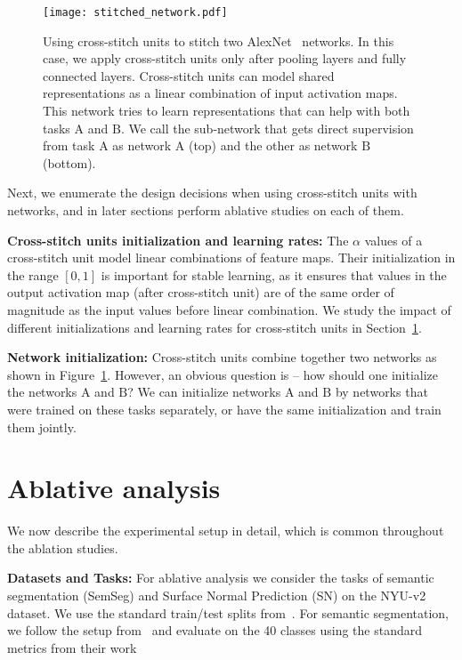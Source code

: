 \documentclass[10pt,twocolumn,letterpaper]{article}
\begin{document}
\begin{figure}[!ht]
\centering
\texttt{[image: stitched\_network.pdf]}
\caption{Using cross-stitch units to stitch two AlexNet~\cite{alexnet} networks. In this case, we apply cross-stitch units only after pooling layers and fully connected layers. Cross-stitch units can model shared representations as a linear combination of input activation maps. This network tries to learn representations that can help with both tasks $\mathrm{A}$ and $\mathrm{B}$. We call the sub-network that gets direct supervision from task $\mathrm{A}$ as network $\mathrm{A}$ (top) and the other as network $\mathrm{B}$ (bottom).}
\label{fig:cross-stitch-two}
\end{figure}

Next, we enumerate the design decisions when using cross-stitch units with networks, and in later sections perform ablative studies on each of them.

\par \noindent \textbf{Cross-stitch units initialization and learning rates:} The $\alpha$ values of a cross-stitch unit model linear combinations of feature maps. Their initialization in the range $\left[0,1\right]$ is important for stable learning, as it ensures that values in the output activation map (after cross-stitch unit) are of the same order of magnitude as the input values before linear combination. We study the impact of different initializations and learning rates for cross-stitch units in Section~\ref{sec:ablation}.


\par \noindent \textbf{Network initialization:} Cross-stitch units combine together two networks as shown in Figure~\ref{fig:cross-stitch-two}. However, an obvious question is -- how should one initialize the networks $\mathrm{A}$ and $\mathrm{B}$? We can initialize networks $\mathrm{A}$ and $\mathrm{B}$ by networks that were trained on these tasks separately, or have the same initialization and train them jointly.

\section{Ablative analysis}
\label{sec:ablation}
We now describe the experimental setup in detail, which is common throughout the ablation studies.

\par \noindent \textbf{Datasets and Tasks:} For ablative analysis we consider the tasks of semantic segmentation (SemSeg) and Surface Normal Prediction (SN) on the NYU-v2~\cite{nyuv2} dataset. We use the standard train/test splits from~\cite{3dp}. For semantic segmentation, we follow the setup from~\cite{gupta2013} and evaluate on the 40 classes using the standard metrics from their work
\end{document}
